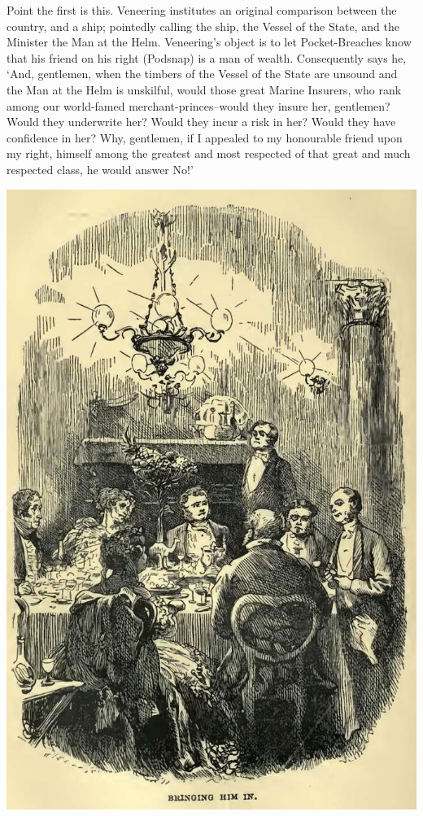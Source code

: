 Point the first is this. Veneering institutes an original comparison
between the country, and a ship; pointedly calling the ship, the Vessel
of the State, and the Minister the Man at the Helm. Veneering’s object
is to let Pocket-Breaches know that his friend on his right (Podsnap) is
a man of wealth. Consequently says he, ‘And, gentlemen, when the timbers
of the Vessel of the State are unsound and the Man at the Helm is
unskilful, would those great Marine Insurers, who rank among our
world-famed merchant-princes--would they insure her, gentlemen? Would
they underwrite her? Would they incur a risk in her? Would they have
confidence in her? Why, gentlemen, if I appealed to my honourable friend
upon my right, himself among the greatest and most respected of that
great and much respected class, he would answer No!’

\includegraphics[scale=2.3]{02-03-01}

